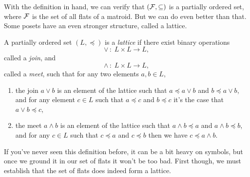 \documentclass[12pt,oneside]{../../sfsuthesis}
\begin{document}
With the definition in hand, we can verify that \( (\mathcal{F}, \subseteq) \) is a partially ordered set, where \( \mathcal{F} \) is the set of all flats of a matroid.
But we can do even better than that.
Some posets have an even stronger structure, called a lattice.

\begin{definition}[Lattice]\th\label{def:lattice}
    A partially ordered set \( (L, \preceq) \) is a \emph{lattice} if there exist binary operations
    \[
        \vee \, : \; L \times L \to L,
    \]
    called a \emph{join}, and
    \[
        \wedge \, : \; L \times L \to L,
    \]
    called a \emph{meet}, such that for any two elements \( a, b \in L \),
    \begin{enumerate}[label=\roman*.]
        \item the join \(a \vee b \) is an element of the lattice such that \( a \preceq a \vee b \) and \( b \preceq a \vee b \), and for any element \( c \in L \) such that \( a \preceq c \) and \( b \preceq c \) it's the case that \( a \vee b \preceq c \),
        \item the meet \(a \wedge b \) is an element of the lattice such that  \( a \wedge b \preceq a \) and \( a \wedge b \preceq b \), and for any \( c \in L \) such that \( c \preceq a \) and \( c \preceq b \) then we have \( c \preceq a \wedge b \).
    \end{enumerate}

\end{definition}

If you've never seen this definition before, it can be a bit heavy on symbols, but once we ground it in our set of flats it won't be too bad.
First though, we must establish that the set of flats does indeed form a lattice.
\end{document}
